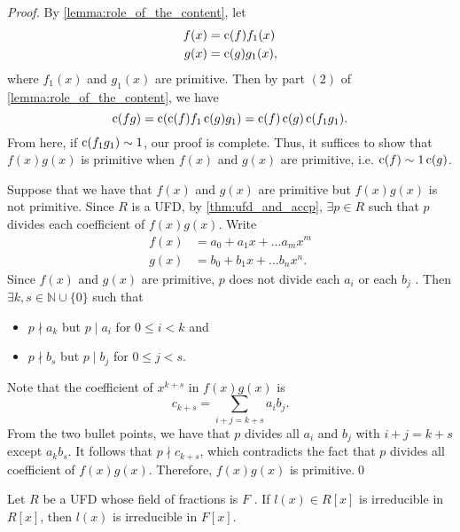 \begin{proof}
  By \cref{lemma:role_of_the_content}, let
  \begin{align*}
    f(x) &= \operatorname{c}(f) f_1(x) \\
    g(x) &= \operatorname{c}(g) g_1(x),
  \end{align*}
  where $f_1(x)$ and $g_1(x)$ are primitive. Then by part $(2)$ of \cref{lemma:role_of_the_content}, we have
  \begin{equation*}
    \operatorname{c}(fg) = \operatorname{c}( \operatorname{c}(f) f_1 \operatorname{c}(g) g_1 ) = \operatorname{c}(f) \operatorname{c}(g) \operatorname{c}( f_1 g_1 ).
  \end{equation*}
  From here, if $\operatorname{c}( f_1 g_1 ) \sim 1$, our proof is complete. Thus, it suffices to show that $f(x) g(x)$ is primitive when $f(x)$ and $g(x)$ are primitive, i.e. $\operatorname{c}(f) \sim 1 \operatorname{c}(g)$.
  
  Suppose that we have that $f(x)$ and $g(x)$ are primitive but $f(x) g(x)$ is not primitive. Since $R$ is a UFD, by \cref{thm:ufd_and_accp}, $\exists p \in R$ such that $p$ divides each coefficient of $f(x) g(x)$. Write
  \begin{align*}
    f(x) &= a_0 + a_1 x + \hdots a_m x^m \\
    g(x) &= b_0 + b_1 x + \hdots b_n x^n.
  \end{align*}
  Since $f(x)$ and $g(x)$ are primitive, $p$ does not divide each $a_i$ or each $b_j$ . Then $\exists k, s \in \mathbb{N} \cup \{0\}$ such that
  \begin{itemize}
    \item $p \nmid a_k$ but $p \mid a_i$ for $0 \leq i < k$ and
    \item $p \nmid b_s$ but $p \mid b_j$ for $0 \leq j < s$.
  \end{itemize}
  Note that the coefficient of $x^{k + s}$ in $f(x) g(x)$ is
  \begin{equation*}
    c_{k + s} = \sum_{i + j = k + s} a_i b_j.
  \end{equation*}
  From the two bullet points, we have that $p$ divides all $a_i$ and $b_j$ with $i + j = k + s$ except $a_k b_s$. It follows that $p \nmid c_{k + s}$, which contradicts the fact that $p$ divides all coefficient of $f(x) g(x)$. Therefore, $f(x) g(x)$ is primitive.\qed
\end{proof}

\begin{thm}
\label{thm:reducibility_in_the_field_of_fractions}
Let $R$ be a UFD whose field of fractions is $F$ . If $l(x) \in R[x]$ is irreducible in $R[x]$, then $l(x)$ is irreducible in $F[x]$.
\end{thm}


